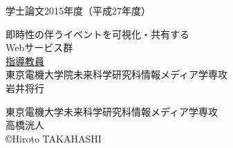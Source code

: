 \pagestyle{empty}
\begin{center}

\LARGE{学士論文\hspace{10mm}2015年度（平成27年度）}\\

\vspace{19mm}

\huge{即時性の伴うイベントを可視化・共有する\\
Webサービス群}\\
\vspace{60mm}
\large{\underline{指導教員}}\\
\large{東京電機大学院未来科学研究科情報メディア学専攻}\\
\Large{岩井将行}\\

\vspace{40mm}

\large{東京電機大学未来科学研究科情報メディア学専攻}\\
\LARGE{高橋洸人}\\
\large{\copyright Hiroto TAKAHASHI}\\
\end{center}
